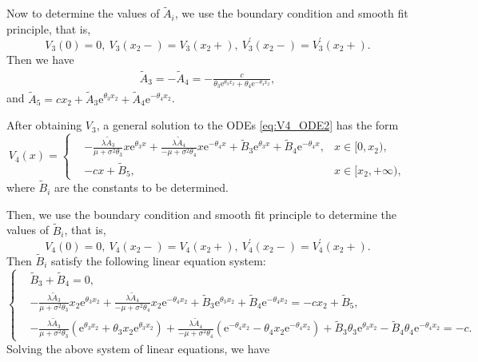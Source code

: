 \documentclass[11pt,reqno]{article}%
\numberwithin{equation}{section}
\begin{document}
Now to determine the values of $\tilde{A}_{i}$, we use the boundary condition and smooth fit principle, that is,
\begin{equation}\nonumber
V_3(0) = 0,\ V_3(x_2 -) = V_3(x_2+),\ V^\prime_3(x_2 -) = V^\prime_3(x_2+).
\end{equation}
Then we have
\begin{equation}\nonumber
\begin{aligned}
 \tilde{A}_{3} =- \tilde{A}_{4}=-\frac{c}{\theta_{3} \mathrm{e}^{\theta_{3}x_2}+\theta_{4}\mathrm{e}^{-\theta_{4}x_2}},\end{aligned}
\end{equation}
and $\tilde{A}_{5}=cx_2+\tilde{A}_{3} \mathrm{e}^{\theta_{3}x_2} + \tilde{A}_{4} \mathrm{e}^{-\theta_{4}x_2}$.

After obtaining $V_3$, a general solution to the ODEs \eqref{eq:V4_ODE2} has the form
\begin{equation}\label{V4deg}
V_4(x) = \left\{\begin{aligned}
& -\frac{\lambda \tilde{A}_3}{\mu+\sigma^2\theta_3}x\mathrm{e}^{\theta_{3}x}+\frac{\lambda \tilde{A}_4}{-\mu+\sigma^2\theta_4}x\mathrm{e}^{-\theta_{4}x}+\tilde{B}_{3} \mathrm{e}^{\theta_{3} x} + \tilde{B}_{4} \mathrm{e}^{-\theta_{4}x}, & x \in [0, x_2),\\
& -cx +\tilde{B}_{5}, \qquad & x \in [x_2, +\infty),
\end{aligned}\right.
\end{equation}
where $\tilde{B}_{i}$ are the constants to be determined.

Then, we use the boundary condition and smooth fit principle to determine the values of $\tilde{B}_{i}$, that is,
\begin{equation}\nonumber
V_4(0) = 0,\ V_4(x_2 -) = V_4(x_2+),\ V^\prime_4(x_2 -) = V^\prime_4(x_2+).
\end{equation}
Then $\tilde{B}_{i}$ satisfy the following linear equation system:
\begin{equation}\nonumber
\left\{\begin{aligned}
& \tilde{B}_{3} + \tilde{B}_{4} = 0, \\
& -\frac{\lambda \tilde{A}_3}{\mu+\sigma^2\theta_3}x_2\mathrm{e}^{\theta_{3}x_2}+\frac{\lambda \tilde{A}_4}{-\mu+\sigma^2\theta_4}x_2\mathrm{e}^{-\theta_{4}x_2}+\tilde{B}_{3} \mathrm{e}^{\theta_{3} x_2} + \tilde{B}_{4} \mathrm{e}^{-\theta_{4}x_2} = -cx_2 + \tilde{B}_{5},\\
& -\frac{\lambda \tilde{A}_3}{\mu+\sigma^2\theta_3}\left(\mathrm{e}^{\theta_{3}x_2}+\theta_{3}x_2\mathrm{e}^{\theta_{3}x_2}\right)+\frac{\lambda \tilde{A}_4}{-\mu+\sigma^2\theta_4}\left(\mathrm{e}^{-\theta_{4}x_2}-\theta_{4}x_2\mathrm{e}^{-\theta_{4}x_2}\right)+\tilde{B}_{3} \theta_{3}\mathrm{e}^{\theta_{3} x_2}-\tilde{B}_{4} \theta_{4}\mathrm{e}^{-\theta_{4}x_2}  = -c.
\end{aligned}\right.
\end{equation}
Solving the above system of linear equations, we have
\end{document}
